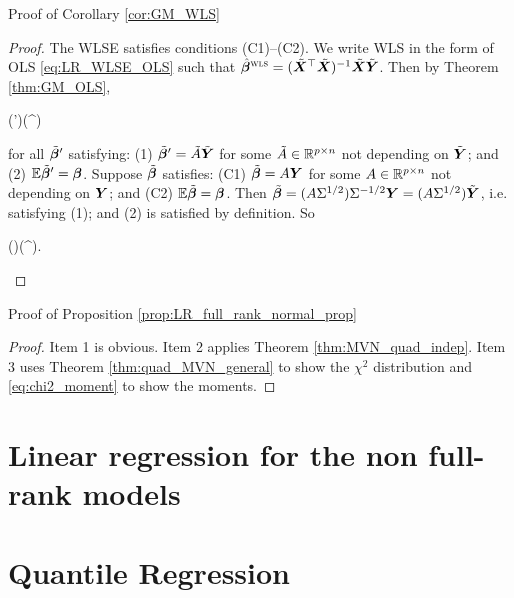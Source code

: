 \documentclass[10pt,a4paper]{book}
\begin{document}
\begin{pfbox}{Proof of Corollary \ref{cor:GM_WLS}}
	\begin{proof}
		The WLSE satisfies conditions (C1)--(C2).
		We write WLS in the form of OLS \eqref{eq:LR_WLSE_OLS} such that $\hat{{\boldsymbol\beta}}^{\textsc{wls}}=(\tilde{{\boldsymbol X}}^\top\tilde{{\boldsymbol X}})^{-1}\tilde{{\boldsymbol X}}\tilde{{\boldsymbol Y}}$. 
		Then by Theorem \ref{thm:GM_OLS}, 
		\begin{sequation*}
			\Cov(\tilde{\bab}')\succeq \Cov(\hat{\bab}^{\WLS})
		\end{sequation*}
		for all $\tilde{{\boldsymbol\beta}}'$ satisfying: (1) $\tilde{{\boldsymbol\beta}}'=\tilde{A}\tilde{{\boldsymbol Y}}$ for some $\tilde{A}\in\mathbb R^{p\times n}$ not depending on $\tilde{{\boldsymbol Y}}$; and (2) $\mathbb E\tilde{{\boldsymbol\beta}}'={\boldsymbol\beta}$.
		Suppose $\tilde{{\boldsymbol\beta}}$ satisfies: (C1) $\tilde{{\boldsymbol\beta}}=A{\boldsymbol Y}$ for some $A\in\mathbb R^{p\times n}$ not depending on ${\boldsymbol Y}$; and (C2) $\mathbb E\tilde{{\boldsymbol\beta}}={\boldsymbol\beta}$.
		Then $\tilde{{\boldsymbol\beta}}=(A\Sigma^{1/2})\Sigma^{-1/2}{\boldsymbol Y}=(A\Sigma^{1/2})\tilde{{\boldsymbol Y}}$, i.e. satisfying (1); and (2) is satisfied by definition. 
		So 
		\begin{sequation*}
			\Cov(\tilde{\bab})\succeq \Cov(\hat{\bab}^{\WLS}).
		\end{sequation*}
	\end{proof}
\end{pfbox}

\begin{pfbox}{Proof of Proposition \ref{prop:LR_full_rank_normal_prop}}
	\begin{proof}
		Item 1 is obvious. Item 2 applies Theorem \ref{thm:MVN_quad_indep}. Item 3 uses Theorem \ref{thm:quad_MVN_general} to show the $\chi^2$ distribution and \eqref{eq:chi2_moment} to show the moments. 
	\end{proof}
\end{pfbox}


\section{Linear regression for the non full-rank models}\label{sec:LR_nonfull_rank}

\section{Quantile Regression}\label{sec:qt_reg}
\end{document}
